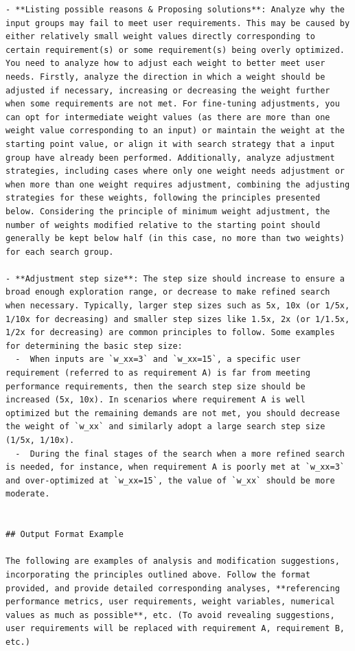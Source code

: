 \documentclass{article}
\begin{document}
\begin{verbatim}
- **Listing possible reasons & Proposing solutions**: Analyze why the input groups may fail to meet user requirements. This may be caused by either relatively small weight values directly corresponding to certain requirement(s) or some requirement(s) being overly optimized. You need to analyze how to adjust each weight to better meet user needs. Firstly, analyze the direction in which a weight should be adjusted if necessary, increasing or decreasing the weight further when some requirements are not met. For fine-tuning adjustments, you can opt for intermediate weight values (as there are more than one weight value corresponding to an input) or maintain the weight at the starting point value, or align it with search strategy that a input group have already been performed. Additionally, analyze adjustment strategies, including cases where only one weight needs adjustment or when more than one weight requires adjustment, combining the adjusting strategies for these weights, following the principles presented below. Considering the principle of minimum weight adjustment, the number of weights modified relative to the starting point should generally be kept below half (in this case, no more than two weights) for each search group.

- **Adjustment step size**: The step size should increase to ensure a broad enough exploration range, or decrease to make refined search when necessary. Typically, larger step sizes such as 5x, 10x (or 1/5x, 1/10x for decreasing) and smaller step sizes like 1.5x, 2x (or 1/1.5x, 1/2x for decreasing) are common principles to follow. Some examples for determining the basic step size:
  -  When inputs are `w_xx=3` and `w_xx=15`, a specific user requirement (referred to as requirement A) is far from meeting performance requirements, then the search step size should be increased (5x, 10x). In scenarios where requirement A is well optimized but the remaining demands are not met, you should decrease the weight of `w_xx` and similarly adopt a large search step size (1/5x, 1/10x).
  -  During the final stages of the search when a more refined search is needed, for instance, when requirement A is poorly met at `w_xx=3` and over-optimized at `w_xx=15`, the value of `w_xx` should be more moderate.


## Output Format Example

The following are examples of analysis and modification suggestions, incorporating the principles outlined above. Follow the format provided, and provide detailed corresponding analyses, **referencing performance metrics, user requirements, weight variables, numerical values as much as possible**, etc. (To avoid revealing suggestions, user requirements will be replaced with requirement A, requirement B, etc.)


\end{verbatim}
\end{document}
